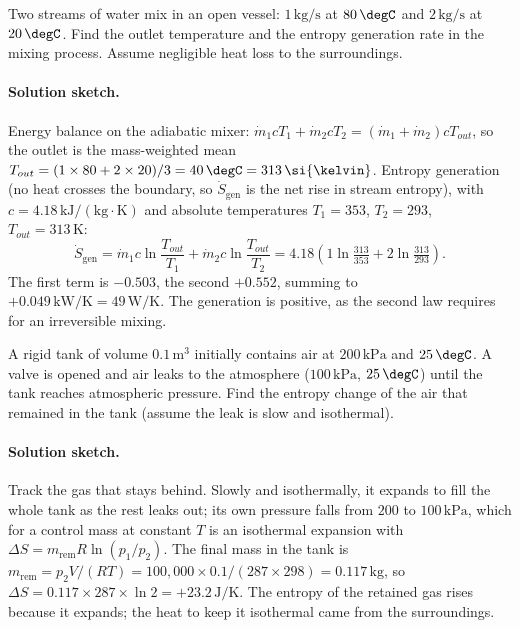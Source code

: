 \begin{exercise}
Two streams of water mix in an open vessel: $1\,\text{kg}/\text{s}$ at
$80\,\degC$ and $2\,\text{kg}/\text{s}$ at $20\,\degC$. Find the
outlet temperature and the entropy generation rate in the mixing
process. Assume negligible heat loss to the surroundings.
\paragraph{Solution sketch.} Energy balance on the adiabatic mixer:
$\dot{m}_1 c T_1 + \dot{m}_2 c T_2 = (\dot{m}_1 + \dot{m}_2) c T_{out}$,
so the outlet is the mass-weighted mean
$T_{out} = (1 \times 80 + 2 \times 20)/3 = 40\,\degC = 313\,\si{\kelvin}$.
Entropy generation (no heat crosses the boundary, so
$\dot{S}_{\text{gen}}$ is the net rise in stream entropy), with
$c = 4.18\,\text{kJ}/(\text{kg}\cdot\si{\kelvin})$ and absolute
temperatures $T_1 = 353$, $T_2 = 293$, $T_{out} = 313\,\si{\kelvin}$:
\[
\dot{S}_{\text{gen}} = \dot{m}_1 c \ln\frac{T_{out}}{T_1} +
\dot{m}_2 c \ln\frac{T_{out}}{T_2}
= 4.18\!\left(1\ln\tfrac{313}{353} + 2\ln\tfrac{313}{293}\right).
\]
The first term is $-0.503$, the second $+0.552$, summing to
$+0.049\,\text{kW}/\si{\kelvin} = 49\,\text{W}/\si{\kelvin}$. The
generation is positive, as the second law requires for an irreversible
mixing.
\end{exercise}

\begin{exercise}
A rigid tank of volume $0.1\,\text{m}^3$ initially contains air at
$200\,\text{kPa}$ and $25\,\degC$. A valve is opened and air leaks to
the atmosphere ($100\,\text{kPa}$, $25\,\degC$) until the tank reaches
atmospheric pressure. Find the entropy change of the air that
remained in the tank (assume the leak is slow and isothermal).
\paragraph{Solution sketch.} Track the gas that stays behind. Slowly
and isothermally, it expands to fill the whole tank as the rest leaks
out; its own pressure falls from $200$ to $100\,\text{kPa}$, which for a
control mass at constant $T$ is an isothermal expansion with
$\Delta S = m_{\text{rem}} R \ln(p_1/p_2)$. The final mass in the tank
is $m_{\text{rem}} = p_2 V/(RT) = 100{,}000 \times 0.1/(287 \times
298) = 0.117\,\text{kg}$, so $\Delta S = 0.117 \times 287 \times
\ln 2 = +23.2\,\text{J}/\si{\kelvin}$. The entropy of the retained gas
rises because it expands; the heat to keep it isothermal came from the
surroundings.
\end{exercise}

